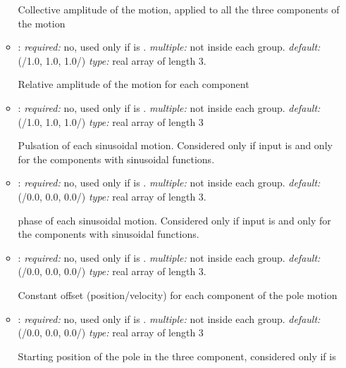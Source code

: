 \begin{itemize}
\begin{itemize}
    Collective amplitude of the motion, applied to all the three components of the motion    
    
     \item {}: \textit{required:} no, used only if  
     is . \textit{multiple:} not inside each  group. 
     \textit{default:} (/1.0, 1.0, 1.0/) \textit{type:} real array of length 3.
    
    Relative amplitude of the motion for each component
    
    \item {}: \textit{required:} no, used only if  
    is . \textit{multiple:} not inside each  group. 
    \textit{default:} (/1.0, 1.0, 1.0/) \textit{type:} real array of length 3
    
    Pulsation of each sinusoidal motion. Considered only if input is 
     and only for the components with sinusoidal functions.
    
    \item {}: \textit{required:} no, used only if  
    is . \textit{multiple:} not inside each  group. 
    \textit{default:} (/0.0, 0.0, 0.0/) \textit{type:} real array of length 3.
    
    phase of each sinusoidal motion. Considered only if input is  
    and only for the components with sinusoidal functions.
    
    \item {}: \textit{required:} no, used only if  
    is . \textit{multiple:} not inside each  group. 
    \textit{default:} (/0.0, 0.0, 0.0/) \textit{type:} real array of length 3.
    
    Constant offset (position/velocity) for each component of the pole motion
    
    \item {}: \textit{required:} no, used only if  
    is . \textit{multiple:} not inside each  group. 
    \textit{default:} (/0.0, 0.0, 0.0/) \textit{type:} real array of length 3
    
    Starting position of the pole in the three component, considered only if 
     is 
    
	\end{itemize}


\end{itemize}
